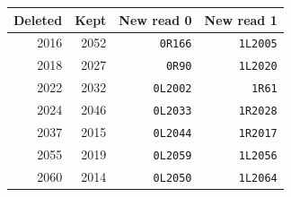 \begin{center}\begin{tabular}{rrrr}\toprule Deleted & Kept & New read 0 & New read 1\\\midrule
2016 & 2052 & \texttt{0R166} & \texttt{1L2005}\\
2018 & 2027 & \texttt{0R90} & \texttt{1L2020}\\
2022 & 2032 & \texttt{0L2002} & \texttt{1R61}\\
2024 & 2046 & \texttt{0L2033} & \texttt{1R2028}\\
2037 & 2015 & \texttt{0L2044} & \texttt{1R2017}\\
2055 & 2019 & \texttt{0L2059} & \texttt{1L2056}\\
2060 & 2014 & \texttt{0L2050} & \texttt{1L2064}\\
\bottomrule\end{tabular}\end{center}

